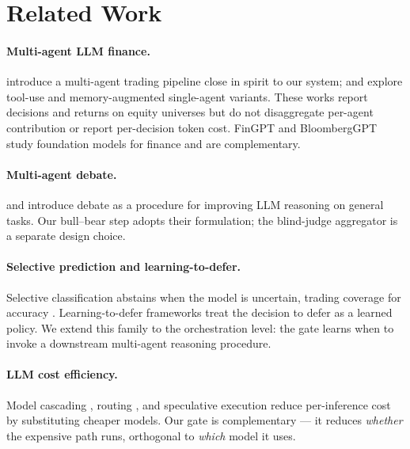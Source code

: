 \documentclass[11pt,a4paper]{article}
\begin{document}
\section{Related Work}
\label{sec:related}

\paragraph{Multi-agent LLM finance.}
\citet{tradingagents} introduce a multi-agent trading pipeline close in
spirit to our system; \citet{finagent} and \citet{finmem} explore tool-use
and memory-augmented single-agent variants. These works report decisions
and returns on equity universes but do not disaggregate per-agent
contribution or report per-decision token cost. FinGPT and BloombergGPT
\citep{fingpt, bloomberggpt} study foundation models for finance and are
complementary.

\paragraph{Multi-agent debate.}
\citet{du2023debate} and \citet{liang2023divergent} introduce debate as a
procedure for improving LLM reasoning on general tasks. Our bull--bear
step adopts their formulation; the blind-judge \citep{madaan2023selfrefine}
aggregator is a separate design choice.

\paragraph{Selective prediction and learning-to-defer.}
Selective classification abstains when the model is uncertain, trading
coverage for accuracy \citep{chow1970, geifman2017selective,
geifman2019selectivenet}. Learning-to-defer frameworks
\citep{mozannar2020defer, charusaie2022sample} treat the decision to defer
as a learned policy. We extend this family to the orchestration level: the
gate learns when to invoke a downstream multi-agent reasoning procedure.

\paragraph{LLM cost efficiency.}
Model cascading \citep{chen2023frugalgpt}, routing
\citep{ong2024routellm}, and speculative execution
\citep{leviathan2023speculative} reduce per-inference cost by substituting
cheaper models. Our gate is complementary --- it reduces \emph{whether} the
expensive path runs, orthogonal to \emph{which} model it uses.
\end{document}
